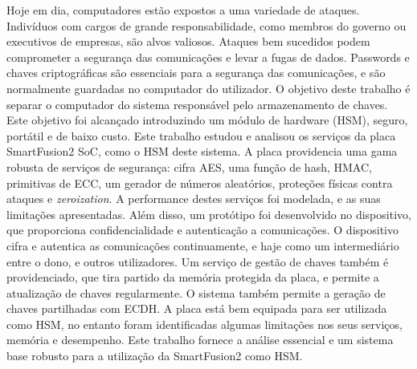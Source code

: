 \noindent Hoje em dia, computadores estão expostos a uma variedade de ataques. Indivíduos com cargos de grande responsabilidade, como membros do governo ou executivos de empresas, são alvos valiosos. Ataques bem sucedidos podem comprometer a segurança das comunicações e levar a fugas de dados. Passwords e chaves criptográficas são essenciais para a segurança das comunicações, e são normalmente guardadas no computador do utilizador. O objetivo deste trabalho é separar o computador do sistema responsável pelo armazenamento de chaves. Este objetivo foi alcançado introduzindo um módulo de hardware (HSM), seguro, portátil e de baixo custo. Este trabalho estudou e analisou os serviços da placa SmartFusion2 \ac{SoC}, como o HSM deste sistema. A placa providencia uma gama robusta de serviços de segurança: cifra AES, uma função de hash, HMAC, primitivas de ECC, um gerador de números aleatórios, proteções físicas contra ataques e \textit{zeroization}. A performance destes serviços foi modelada, e as suas limitações apresentadas. Além disso, um protótipo foi desenvolvido no dispositivo, que proporciona confidencialidade e autenticação a comunicações. O dispositivo cifra e autentica as comunicações continuamente, e haje como um intermediário entre o dono, e outros utilizadores. Um serviço de gestão de chaves também é providenciado, que tira partido da memória protegida da placa, e permite a atualização de chaves regularmente. O sistema também permite a geração de chaves partilhadas com ECDH. A placa está bem equipada para ser utilizada como HSM, no entanto foram identificadas algumas limitações nos seus serviços, memória e desempenho. Este trabalho fornece a análise essencial e um sistema base robusto para a utilização da SmartFusion2 como HSM.
